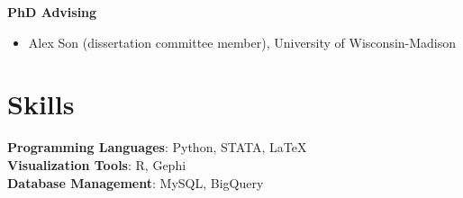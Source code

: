 \documentclass[a4paper,11pt]{article}
\begin{document}
\vspace{4pt}
\textbf{PhD Advising}
\begin{itemize}[leftmargin=1.5em, itemsep=1pt, topsep=2pt, parsep=0pt]
    \item \small Alex Son (dissertation committee member), University of Wisconsin-Madison
\end{itemize}

\section{Skills}

\textbf{Programming Languages}{: Python, STATA, \LaTeX} \\
\textbf{Visualization Tools}{: R, Gephi} \\
\textbf{Database Management}{: MySQL, BigQuery}

\end{document}
